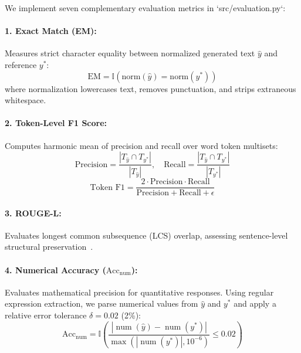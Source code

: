 \documentclass[11pt]{article}
\begin{document}
We implement seven complementary evaluation metrics in `src/evaluation.py`:

\paragraph{1. Exact Match (EM):} Measures strict character equality between normalized generated text $\hat{y}$ and reference $y^*$:
\begin{equation}
\text{EM} = \mathbb{I}\left( \text{norm}(\hat{y}) = \text{norm}(y^*) \right)
\end{equation}
where normalization lowercases text, removes punctuation, and strips extraneous whitespace.

\paragraph{2. Token-Level F1 Score:} Computes harmonic mean of precision and recall over word token multisets:
\begin{equation}
\text{Precision} = \frac{|T_{\hat{y}} \cap T_{y^*}|}{|T_{\hat{y}}|}, \quad \text{Recall} = \frac{|T_{\hat{y}} \cap T_{y^*}|}{|T_{y^*}|}
\end{equation}
\begin{equation}
\text{Token F1} = \frac{2 \cdot \text{Precision} \cdot \text{Recall}}{\text{Precision} + \text{Recall} + \epsilon}
\end{equation}

\paragraph{3. ROUGE-L:} Evaluates longest common subsequence (LCS) overlap, assessing sentence-level structural preservation~\citep{lin2004rouge}.

\paragraph{4. Numerical Accuracy ($\text{Acc}_{\text{num}}$):} Evaluates mathematical precision for quantitative responses. Using regular expression extraction, we parse numerical values from $\hat{y}$ and $y^*$ and apply a relative error tolerance $\delta = 0.02$ (2\%):
\begin{equation}
\text{Acc}_{\text{num}} = \mathbb{I}\left( \frac{|\operatorname{num}(\hat{y}) - \operatorname{num}(y^*)|}{\max(|\operatorname{num}(y^*)|, 10^{-6})} \le 0.02 \right)
\end{equation}
\end{document}
